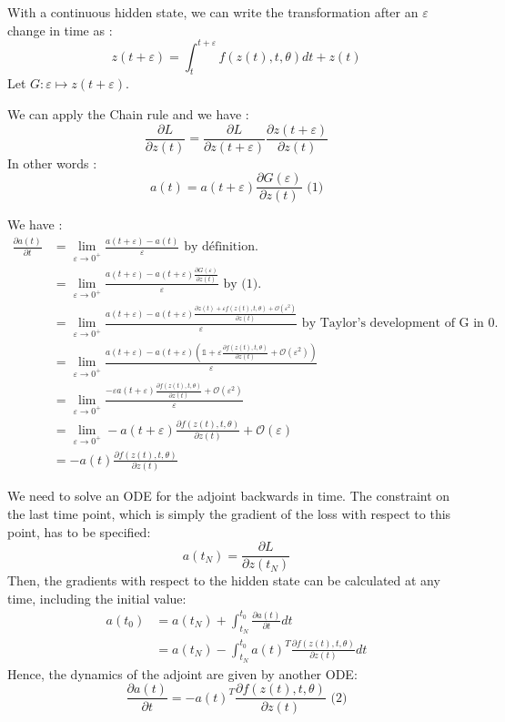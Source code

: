 \documentclass[10pt,a4paper]{article}
\theoremstyle{definition}
\theoremstyle{definition}
\begin{document}
With a continuous hidden state, we can write the transformation after an $\varepsilon$ change in time as :
$$
z(t+\varepsilon) = \int^{t+\varepsilon}_{t} f(z(t),t,\theta) dt + z(t)
$$
Let $ G : \varepsilon \mapsto z(t+\varepsilon)$.

We can apply the Chain rule and we have :
$$
\frac{\partial L}{\partial z(t)} = \frac{\partial L}{\partial z(t+\varepsilon)} \frac{\partial z(t+\varepsilon)}{\partial z(t)}
$$
In other words :
$$
a(t) = a(t+\varepsilon)\frac{\partial G(\varepsilon)}{\partial z(t)} \text{   (1)}
$$

We have :
\begin{align*}
\frac{\partial a(t)}{\partial t} &= \lim_{\varepsilon \rightarrow 0^+} \frac{a(t+\varepsilon) - a(t)}{\varepsilon} \text{ by définition.}\\
&= \lim_{\varepsilon \rightarrow 0^+} \frac{a(t+\varepsilon) - a(t+\varepsilon)\frac{\partial G(\varepsilon)}{\partial z(t)}}{\varepsilon} \text{ by (1).}\\
&= \lim_{\varepsilon \rightarrow 0^+} \frac{a(t+\varepsilon) - a(t+\varepsilon)\frac{\partial z(t) + \varepsilon f(z(t),t,\theta) + \mathcal{O}(\varepsilon^2)}{\partial z(t)}}{\varepsilon} \text{ by Taylor's development of G in 0.} \\
&= \lim_{\varepsilon \rightarrow 0^+} \frac{a(t+\varepsilon) - a(t+\varepsilon)(\mathbb{1} + \varepsilon \frac{\partial f(z(t),t,\theta)} {\partial z(t)}+ \mathcal{O}(\varepsilon^2))}{\varepsilon}\\
&= \lim_{\varepsilon \rightarrow 0^+} \frac{-\varepsilon a(t+\varepsilon) \frac{\partial f(z(t),t,\theta)} {\partial z(t)}+ \mathcal{O}(\varepsilon^2)}{\varepsilon}\\
&= \lim_{\varepsilon \rightarrow 0^+} - a(t+\varepsilon) \frac{\partial f(z(t),t,\theta)} {\partial z(t)}+ \mathcal{O}(\varepsilon)\\
&= -a(t)\frac{\partial f(z(t),t,\theta)} {\partial z(t)}
\end{align*}
 
We need to solve an ODE for the adjoint backwards in time. The constraint on the last time point, which is simply the gradient of the loss with respect to this point, has to be specified:
$$
a(t_N) = \frac{\partial L}{\partial z(t_N)}
$$
Then, the gradients with respect to the hidden state can be calculated at any time, including the initial value:
\begin{align*}
a(t_0) &= a(t_N) + \int^{t_0}_{t_N} \frac{\partial a(t)}{\partial t} dt\\
&= a(t_N) - \int^{t_0}_{t_N} a(t)^T \frac{\partial f(z(t),t,\theta)} {\partial z(t)} dt
\end{align*}
Hence, the dynamics of the adjoint are given by another ODE:
$$
\frac{\partial a(t)}{\partial t} = -a(t)^T \frac{\partial f(z(t),t,\theta)} {\partial z(t)} \text{ (2)}
$$
\end{document}
